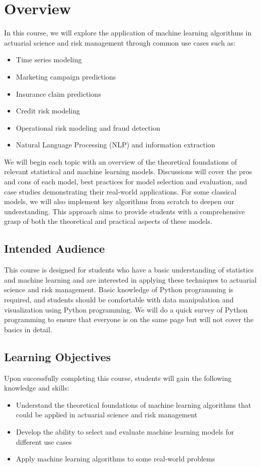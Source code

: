 \documentclass[a4paper, 12pt]{article}
\begin{document}
\section{Overview}
In this course, we will explore the application of machine learning algorithms in actuarial science and risk management through common use cases such as:
\begin{itemize}
    \item Time series modeling
    \item Marketing campaign predictions
    \item Insurance claim predictions
    \item Credit risk modeling
    \item Operational risk modeling and fraud detection
    \item Natural Language Processing (NLP) and information extraction
\end{itemize}
We will begin each topic with an overview of the theoretical foundations of relevant statistical and machine learning models. Discussions will cover the pros and cons of each model, best practices for model selection and evaluation, and case studies demonstrating their real-world applications. For some classical models, we will also implement key algorithms from scratch to deepen our understanding. This approach aims to provide students with a comprehensive grasp of both the theoretical and practical aspects of these models.

\subsection{Intended Audience}
This course is designed for students who have a basic understanding of statistics and machine learning and are interested in applying these techniques to actuarial science and risk management. Basic knowledge of Python programming is required, and students should be comfortable with data manipulation and visualization using Python programming. We will do a quick survey of Python programming to ensure that everyone is on the same page but will not cover the basics in detail.

\subsection{Learning Objectives}
Upon successfully completing this course, students will gain the following knowledge and skills:
\begin{itemize}
    \item Understand the theoretical foundations of machine learning algorithms that could be applied in actuarial science and risk management
    \item Develop the ability to select and evaluate machine learning models for different use cases
    \item Apply machine learning algorithms to some real-world problems 
\end{itemize}
\end{document}
